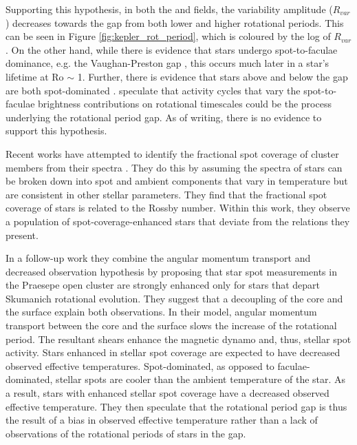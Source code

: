 Supporting this hypothesis, in both the \kepler{} and \ktoo{} fields, the variability amplitude ($R_{var}$) decreases towards the gap from both lower and higher rotational periods.
This can be seen in Figure \ref{fig:kepler_rot_period}, which is coloured by the log of $R_{var}$.
On the other hand, while there is evidence that stars undergo spot-to-faculae dominance, e.g. the Vaughan-Preston gap \citep{vaughan_survey_1980}, this occurs much later in a star's lifetime at Ro $\sim$ 1.
Further, there is evidence that stars above and below the gap are both spot-dominated  \citep{lockwood_patterns_2007, reinhold_transition_2019}.
\citet{reinhold_transition_2019} speculate that activity cycles that vary the spot-to-faculae brightness contributions on rotational timescales could be the process underlying the rotational period gap.
As of writing, there is no evidence to support this hypothesis.

Recent works have attempted to identify the fractional spot coverage of cluster members from their spectra \citep{cao_starspots_2022}.
They do this by assuming the spectra of stars can be broken down into spot and ambient components that vary in temperature but are consistent in other stellar parameters.
They find that the fractional spot coverage of stars is related to the Rossby number.
Within this work, they observe a population of spot-coverage-enhanced stars that deviate from the relations they present.

In a follow-up work \citep{cao_core-envelope_2023} they combine the angular momentum transport and decreased observation hypothesis by proposing
that star spot measurements in the Praesepe open cluster are strongly enhanced only for stars that depart Skumanich rotational evolution.
They suggest that a decoupling of the core and the surface explain both observations.
In their model, angular momentum transport between the core and the surface slows the increase of the rotational period. 
The resultant shears enhance the magnetic dynamo and, thus, stellar spot activity.
Stars enhanced in stellar spot coverage are expected to have decreased observed effective temperatures.
Spot-dominated, as opposed to faculae-dominated, stellar spots are cooler than the ambient temperature of the star.
As a result, stars with enhanced stellar spot coverage have a decreased observed effective temperature.
They then speculate that the rotational period gap is thus the result of a bias in observed effective temperature rather than a lack of observations of the rotational periods of stars in the gap.

